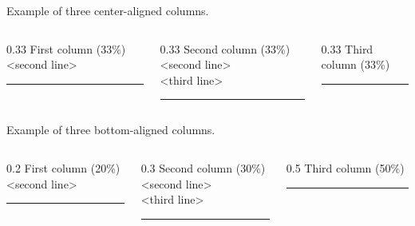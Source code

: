 \documentclass[9pt,english]{Beamer_PROMES}\uselanguage{English}\languagepath{English}
\begin{document}
\begin{frame}

Example of three center-aligned columns.

\vspace{3mm}
\begin{columns}[c,onlytextwidth]
   \begin{column}{0.33\textwidth-0.2cm}
      First column (33\%)
      <second line>
      \par\noindent\rule{\textwidth}{1pt}
   \end{column}
   \begin{column}{0.33\textwidth-0.2cm}
      Second column (33\%)
      <second line>\\
      <third line>
      \par\noindent\rule{\textwidth}{1pt}
   \end{column}
   \begin{column}{0.33\textwidth-0.2cm}
      Third column (33\%)
      \par\noindent\rule{\textwidth}{1pt}
   \end{column}
\end{columns}
\vspace{3mm}

Example of three bottom-aligned columns.

\vspace{3mm}
\begin{columns}[b,onlytextwidth]
   \begin{column}{0.2\textwidth-0.2cm}
      First column (20\%)\\
      <second line>
      \par\noindent\rule{\textwidth}{1pt}
   \end{column}
   \begin{column}{0.3\textwidth-0.2cm}
      Second column (30\%)\\
      <second line>\\
      <third line>
      \par\noindent\rule{\textwidth}{1pt}
   \end{column}
   \begin{column}{0.5\textwidth-0.2cm}
      Third column (50\%)
      \par\noindent\rule{\textwidth}{1pt}
   \end{column}
\end{columns}
\vspace{3mm}

\end{frame}
\end{document}
